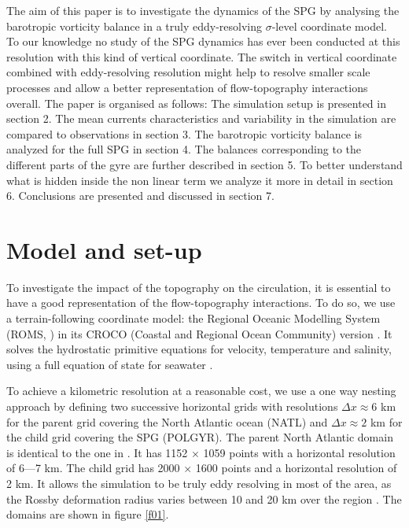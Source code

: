 \documentclass[os, manuscript]{copernicus}
\begin{document}
The aim of this paper is to investigate the dynamics of the SPG by analysing the barotropic vorticity balance in a truly eddy-resolving $\sigma$-level coordinate model. To our knowledge no study of the SPG dynamics has ever been conducted at this resolution with this kind of vertical coordinate. The switch in vertical coordinate combined with eddy-resolving resolution might help to resolve smaller scale processes and allow a better representation of flow-topography interactions overall. The paper is organised as follows: The simulation setup is presented in section 2. The mean currents characteristics and variability in the simulation are compared to observations in section 3. The barotropic vorticity balance is analyzed for the full SPG in section 4. The balances corresponding to the different parts of the gyre are further described in section 5. To better understand what is hidden inside the non linear term we analyze it more in detail in section 6. Conclusions are presented and discussed in section 7.  

\section{Model and set-up}
To investigate the impact of the topography on the circulation, it is essential to have a good representation of the flow-topography interactions. To do so, we use a terrain-following coordinate model: the Regional Oceanic Modelling System (ROMS, \citet{shchepetkin2009}) in its CROCO (Coastal and Regional Ocean Community) version \citep{debreu2012}. It solves the hydrostatic primitive equations for velocity, temperature and salinity, using a full equation of state for seawater \citep{shchepetkin2009,shchepetkin2011}. 

To achieve a kilometric resolution at a reasonable cost, we use a one way nesting approach by defining two successive horizontal grids with resolutions $\Delta x \approx 6$ km for the parent grid covering the North Atlantic ocean (NATL) and $\Delta x \approx 2$ km for the child grid covering the SPG (POLGYR). The parent North Atlantic domain is identical to the one in \cite{renault2016}. It has 1152 $\times$ 1059 points  with a horizontal resolution of 6---7 km. The child grid has 2000 $\times$ 1600 points and a horizontal resolution of 2 km. It allows the simulation to be truly eddy resolving in most of the area, as the Rossby deformation radius varies between 10 and 20 km over the region \citep{chelton1998}. The domains are shown in figure \ref{f01}. 
\end{document}
